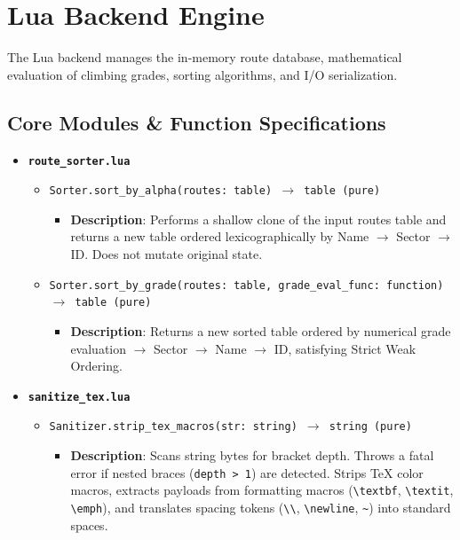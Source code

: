 \section{Lua Backend Engine}

The Lua backend manages the in-memory route database, mathematical evaluation of climbing grades, sorting algorithms, and I/O serialization.

\subsection{Core Modules \& Function Specifications}

\begin{itemize}
    \item \textbf{\texttt{route\_sorter.lua}}
    \begin{itemize}
        \item \texttt{Sorter.sort\_by\_alpha(routes: table) $\rightarrow$ table (pure)}
        \begin{itemize}
            \item \textbf{Description}: Performs a shallow clone of the input routes table and returns a new table ordered lexicographically by Name $\rightarrow$ Sector $\rightarrow$ ID. Does not mutate original state.
        \end{itemize}
        \item \texttt{Sorter.sort\_by\_grade(routes: table, grade\_eval\_func: function) $\rightarrow$ table (pure)}
        \begin{itemize}
            \item \textbf{Description}: Returns a new sorted table ordered by numerical grade evaluation $\rightarrow$ Sector $\rightarrow$ Name $\rightarrow$ ID, satisfying Strict Weak Ordering.
        \end{itemize}
    \end{itemize}

    \item \textbf{\texttt{sanitize\_tex.lua}}
    \begin{itemize}
        \item \texttt{Sanitizer.strip\_tex\_macros(str: string) $\rightarrow$ string (pure)}
        \begin{itemize}
            \item \textbf{Description}: Scans string bytes for bracket depth. Throws a fatal error if nested braces (\texttt{depth > 1}) are detected. Strips TeX color macros, extracts payloads from formatting macros (\texttt{\textbackslash textbf}, \texttt{\textbackslash textit}, \texttt{\textbackslash emph}), and translates spacing tokens (\texttt{\textbackslash \textbackslash}, \texttt{\textbackslash newline}, \texttt{\~{}}) into standard spaces.
        \end{itemize}
    \end{itemize}


\end{itemize}
